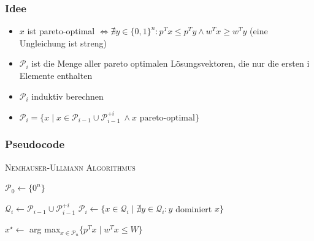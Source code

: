 \documentclass{presentation}
\begin{document}
\begin{frame}
    \frametitle{Idee}
    \begin{itemize}
        \item $x$ ist pareto-optimal $\iff \nexists y \in \{0, 1\}^n: p^T x \leq p^T y \land w^T x \geq w^T y$
        (eine Ungleichung ist streng)
        \pause

        \item $\mathcal{P}_i$ ist die Menge aller pareto optimalen Lösungsvektoren, die nur die ersten i Elemente enthalten
        \pause

        \item $\mathcal{P}_i$ induktiv berechnen
        \pause

        \item $\mathcal{P}_i = \{ x \mid x \in \mathcal{P}_{i-1} \cup \mathcal{P}_{i-1}^{+i} \: \land x\text{ pareto-optimal}\}$
    \end{itemize}
\end{frame}



%



\begin{frame}[fragile]
    \frametitle{Pseudocode}
    \textsc{\large Nemhauser-Ullmann Algorithmus}
    \begin{algorithmic}[1]
        \State $\mathcal{P}_0  \gets \{ 0^n \}$
        \pause

            \State $\mathcal{Q}_i \gets \mathcal{P}_{i-1} \cup \mathcal{P}_{i-1}^{+i}$
            \State $\mathcal{P}_i \gets \{x \in \mathcal{Q}_i \mid \nexists y \in \mathcal{Q}_i: y$ dominiert $x \}$
        \EndFor
        \pause

        \State \Return $x^\star \gets$ arg max$_{x \in \mathcal{P}_n}\{p^T x \mid w^T x \leq W \}$
    \end{algorithmic}

\end{frame}
\end{document}
